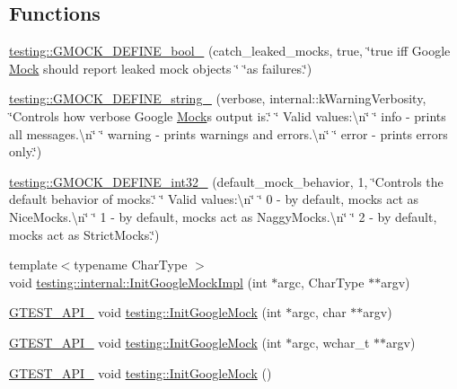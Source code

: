\subsection*{Functions}
\begin{DoxyCompactItemize}
\item 
\mbox{\hyperlink{namespacetesting_aca5af0e8943ba53352537ab84233b47f}{testing\+::\+G\+M\+O\+C\+K\+\_\+\+D\+E\+F\+I\+N\+E\+\_\+bool\+\_\+}} (catch\+\_\+leaked\+\_\+mocks, true, \char`\"{}true iff Google \mbox{\hyperlink{class_mock}{Mock}} should report leaked mock objects \char`\"{} \char`\"{}as failures.\char`\"{})
\item 
\mbox{\hyperlink{namespacetesting_a92ea84a47432512152022ef73176676f}{testing\+::\+G\+M\+O\+C\+K\+\_\+\+D\+E\+F\+I\+N\+E\+\_\+string\+\_\+}} (verbose, internal\+::k\+Warning\+Verbosity, \char`\"{}Controls how verbose Google \mbox{\hyperlink{class_mock}{Mock}}\textquotesingle{}s output is.\char`\"{} \char`\"{}  Valid values\+:\textbackslash{}n\char`\"{} \char`\"{}  info    -\/ prints all messages.\textbackslash{}n\char`\"{} \char`\"{}  warning -\/ prints warnings and errors.\textbackslash{}n\char`\"{} \char`\"{}  error   -\/ prints errors only.\char`\"{})
\item 
\mbox{\hyperlink{namespacetesting_a211b4be008f5b4cccee486a262d91a52}{testing\+::\+G\+M\+O\+C\+K\+\_\+\+D\+E\+F\+I\+N\+E\+\_\+int32\+\_\+}} (default\+\_\+mock\+\_\+behavior, 1, \char`\"{}Controls the default behavior of mocks.\char`\"{} \char`\"{}  Valid values\+:\textbackslash{}n\char`\"{} \char`\"{}  0 -\/ by default, mocks act as Nice\+Mocks.\textbackslash{}n\char`\"{} \char`\"{}  1 -\/ by default, mocks act as Naggy\+Mocks.\textbackslash{}n\char`\"{} \char`\"{}  2 -\/ by default, mocks act as Strict\+Mocks.\char`\"{})
\item 
{\footnotesize template$<$typename Char\+Type $>$ }\\void \mbox{\hyperlink{namespacetesting_1_1internal_a3823844199df88af9493026031cf7744}{testing\+::internal\+::\+Init\+Google\+Mock\+Impl}} (int $\ast$argc, Char\+Type $\ast$$\ast$argv)
\item 
\mbox{\hyperlink{_obj__test_2lib_2googletest-release-1_88_81_2googletest_2include_2gtest_2internal_2gtest-port_8h_aa73be6f0ba4a7456180a94904ce17790}{G\+T\+E\+S\+T\+\_\+\+A\+P\+I\+\_\+}} void \mbox{\hyperlink{namespacetesting_a32b1c6db9ba5133ccabfa67616b3c041}{testing\+::\+Init\+Google\+Mock}} (int $\ast$argc, char $\ast$$\ast$argv)
\item 
\mbox{\hyperlink{_obj__test_2lib_2googletest-release-1_88_81_2googletest_2include_2gtest_2internal_2gtest-port_8h_aa73be6f0ba4a7456180a94904ce17790}{G\+T\+E\+S\+T\+\_\+\+A\+P\+I\+\_\+}} void \mbox{\hyperlink{namespacetesting_a20fb86152763dddef67bc1dd8b090800}{testing\+::\+Init\+Google\+Mock}} (int $\ast$argc, wchar\+\_\+t $\ast$$\ast$argv)
\item 
\mbox{\hyperlink{_obj__test_2lib_2googletest-release-1_88_81_2googletest_2include_2gtest_2internal_2gtest-port_8h_aa73be6f0ba4a7456180a94904ce17790}{G\+T\+E\+S\+T\+\_\+\+A\+P\+I\+\_\+}} void \mbox{\hyperlink{namespacetesting_a9276d4bc746722cb4fe99415c1dc778f}{testing\+::\+Init\+Google\+Mock}} ()
\end{DoxyCompactItemize}
